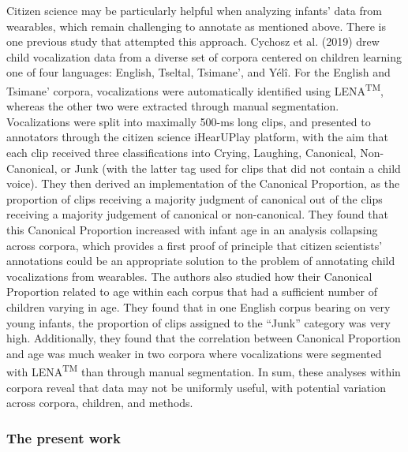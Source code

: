 \documentclass[english,,man]{apa6}
\begin{document}
Citizen science may be particularly helpful when analyzing infants' data from wearables, which remain challenging to annotate as mentioned above. There is one previous study that attempted this approach. Cychosz et al. (2019) drew child vocalization data from a diverse set of corpora centered on children learning one of four languages: English, Tseltal, Tsimane', and Yélî. For the English and Tsimane' corpora, vocalizations were automatically identified using LENA\textsuperscript{TM}, whereas the other two were extracted through manual segmentation. Vocalizations were split into maximally 500-ms long clips, and presented to annotators through the citizen science iHearUPlay platform, with the aim that each clip received three classifications into Crying, Laughing, Canonical, Non-Canonical, or Junk (with the latter tag used for clips that did not contain a child voice). They then derived an implementation of the Canonical Proportion, as the proportion of clips receiving a majority judgment of canonical out of the clips receiving a majority judgement of canonical or non-canonical. They found that this Canonical Proportion increased with infant age in an analysis collapsing across corpora, which provides a first proof of principle that citizen scientists' annotations could be an appropriate solution to the problem of annotating child vocalizations from wearables. The authors also studied how their Canonical Proportion related to age within each corpus that had a sufficient number of children varying in age. They found that in one English corpus bearing on very young infants, the proportion of clips assigned to the \enquote{Junk} category was very high. Additionally, they found that the correlation between Canonical Proportion and age was much weaker in two corpora where vocalizations were segmented with LENA\textsuperscript{TM} than through manual segmentation. In sum, these analyses within corpora reveal that data may not be uniformly useful, with potential variation across corpora, children, and methods.

\hypertarget{the-present-work}{%
\subsubsection{The present work}\label{the-present-work}}
\end{document}
